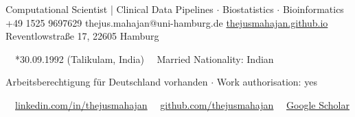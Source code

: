 \documentclass{thejus_cv}
\begin{document}
         {Computational Scientist | Clinical Data Pipelines $\cdot$ Biostatistics $\cdot$ Bioinformatics}
         {+49 1525 9697629}
         {thejus.mahajan@uni-hamburg.de}
         {\href{https://thejusmahajan.github.io}{thejusmahajan.github.io}}
         {Reventlowstra{\ss}e 17, 22605 Hamburg}

\vspace{-1.45cm}
{\small\color{white}
\faCalendar\ \ *30.09.1992 (Talikulam, India) \hspace{0.5cm} \faUser\ \ Married \hspace{0.5cm} Nationality: Indian
}\par
\vspace{0.1cm}
{\small\color{white}
Arbeitsberechtigung f\"ur Deutschland vorhanden $\cdot$ Work authorisation: yes
}\par
\vspace{0.1cm}
{\small\color{white}
\faLinkedin\ \ \href{https://www.linkedin.com/in/thejusmahajan/}{linkedin.com/in/thejusmahajan}
\hspace{0.5cm}
\faGithub\ \ \href{https://github.com/thejusmahajan}{github.com/thejusmahajan}
\hspace{0.5cm}
\faGraduationCap\ \ \href{https://scholar.google.com/citations?user=PJkZwAwAAAAJ}{Google Scholar}
}\par
\vspace{0.1cm}
\end{document}
